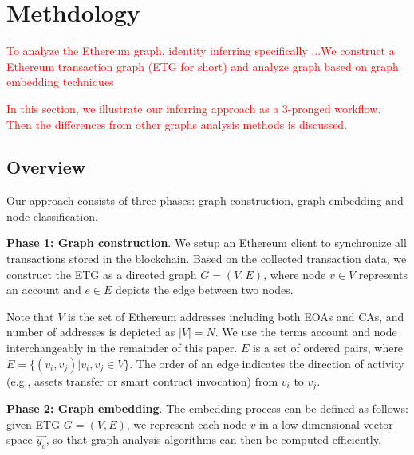 
\section{Methdology}
\label{sec:graph_analysis}
\textcolor{red}{To analyze the Ethereum graph, identity inferring specifically ...We construct a Ethereum transaction graph (ETG for short) and analyze graph based on graph embedding techniques}

\textcolor{red}{In this section, we illustrate our inferring approach as a 3-pronged workflow. Then the differences from other graphs analysis methods is discussed.} 


\subsection{Overview}
\label{subsec:methodology}
Our approach consists of three phases: graph construction, graph embedding and node classification.

\textbf{Phase 1: Graph construction}. We setup an Ethereum client to synchronize all transactions stored in the blockchain. Based on the collected transaction data, we construct the ETG as a directed graph $G=(V,E)$, where node $v \in V$ represents an account and $e \in E$ depicts the edge between two nodes.

Note that $V$ is the set of Ethereum addresses including both EOAs and CAs, and number of addresses is depicted as $|V|=N$. We use the terms account and node interchangeably in the remainder of this paper. $E$ is a set of ordered pairs, where $E=\{(v_i,v_j)|v_i,v_j \in V\}$. The order of an edge indicates the direction of activity (e.g., assets transfer or smart contract invocation) from $v_i$ to $v_j$. %



\textbf{Phase 2: Graph embedding}.
The embedding process can be defined as follows: given ETG $G=(V,E)$, we represent each node $v$ in a low-dimensional vector space $\vec{y_v}$, so that graph analysis algorithms can then be computed efficiently.

